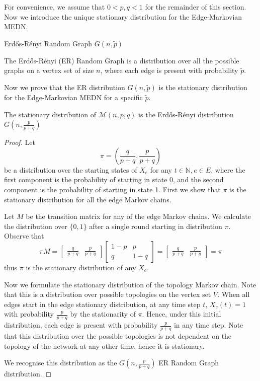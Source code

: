 For convenience, we assume that $0 < p, q < 1$ for the remainder of this section. Now we introduce the unique stationary distribution for the Edge-Markovian MEDN. 

\begin{definition}
	Erdős-Rényi Random Graph $G(n,\tilde{p})$

	\noindent	
	The Erdős-Rényi (ER) Random Graph is a distribution over all the possible graphs on a vertex set of size $n$, where each edge is present with probability $\tilde{p}$.
\end{definition}

Now we prove that the ER distribution $G(n,\tilde{p})$ is the stationary distribution for the Edge-Markovian MEDN for a specific $\tilde{p}$.

\begin{lemma}
	The stationary distribution of $\mathcal{M}(n, p, q)$ is the Erdős-Rényi distribution $G(n, \frac{p}{p+q})$ 
\end{lemma}

\begin{proof}
	Let 
	$$
		\pi = \left(\frac{q}{p+q}, \frac{p}{p+q}\right)
	$$ 
	be a distribution over the starting states of $X_e$ for any $t \in \mathbb{N}, e \in E$,
	where the first component is the probability of starting in state 0, and the second component is the probability of starting in state 1. First we show that $\pi$ is the stationary distribution for all the edge Markov chains.

	Let $M$ be the transition matrix for any of the edge Markov chains. We calculate the distribution over $\{0,1\}$ after a single round starting in distribution $\pi$. Observe that
	$$
		\pi M =
		\begin{bmatrix}
			\frac{q}{p+q} & \frac{p}{p+q}
		\end{bmatrix}
		\begin{bmatrix}
			1 - p & p \\
			q & 1 - q 
		\end{bmatrix}
		= \begin{bmatrix}
			\frac{q}{p+q} & \frac{p}{p+q}
		\end{bmatrix}
		= \pi
	$$
	thus $\pi$ is the stationary distribution of any $X_e$.
	
	Now we formulate the stationary distribution of the topology Markov chain. Note that this is a distribution over possible topologies on the vertex set $V$. When all edges start in the edge stationary distribution, at any time step $t$, $X_e(t) = 1$ with probability $\frac{p}{p+q}$ by the stationarity of $\pi$. Hence, under this initial distribution, each edge is present with probability $\frac{p}{p+q}$ in any time step. Note that this distribution over the possible topologies is not dependent on the topology of the network at any other time, hence it is stationary. 

	We recognise this distribution as the $G(n, \frac{p}{p+q})$ ER Random Graph distribution.
\end{proof}

